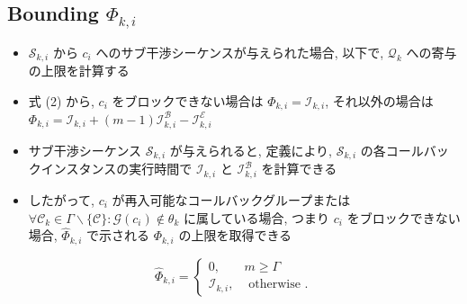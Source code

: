\subsection{Bounding $\Phi_{k, i}$}
\label{ssec: bounding_phi}

\begin{frame}{}
    \begin{itemize}
        \item $\mathcal{S}_{k, i}$ から $c_{i}$ へのサブ干渉シーケンスが与えられた場合, 以下で, $\mathcal{Q}_{k}$ への寄与の上限を計算する
    \end{itemize}
\end{frame}

\begin{frame}{}
    \begin{itemize}
        \item 式 (2) から, $c_{i}$ をブロックできない場合は $\Phi_{k, i}=\mathcal{I}_{k, i}$, それ以外の場合は $\Phi_{k, i}=\mathcal{I}_{k, i}+(m-1) \mathcal{I}_{k, i}^{\mathcal{B}}-\mathcal{I}_{k, i}^{\mathcal{E}}$
        \item サブ干渉シーケンス $\mathcal{S}_{k, i}$ が与えられると, 定義により, $\mathcal{S}_{k, i}$ の各コールバックインスタンスの実行時間で $\mathcal{I}_{k, i}$ と $\mathcal{I}_{k, i}^{\mathcal{B}}$ を計算できる
        \item したがって, $c_{i}$ が再入可能なコールバックグループまたは $\forall \mathcal{C}_{k} \in \Gamma \backslash\{\mathcal{C}\}: \mathcal{G}\left(c_{i}\right) \notin \theta_{k}$ に属している場合, つまり $c_{i}$ をブロックできない場合,  $\hat{\Phi}_{k, i}$ で示される $\Phi_{k, i}$ の上限を取得できる
    \end{itemize}

    \begin{equation*}
        \hat{\Phi}_{k, i}=\left\{\begin{array}{lr}
            0,                  & m \geq \Gamma         \\
            \mathcal{I}_{k, i}, & \text { otherwise } .
        \end{array}\right.
    \end{equation*}
\end{frame}

